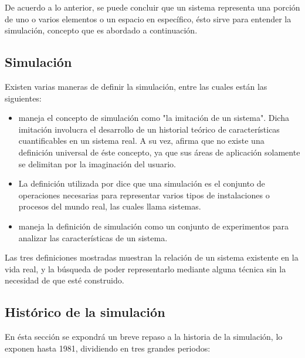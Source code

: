 
De acuerdo a lo anterior, se puede concluir que un sistema representa una porción de uno o varios elementos o un espacio en específico, ésto sirve para entender la simulación, concepto que es abordado a continuación. 

\subsection{Simulación}

Existen varias maneras de definir la simulación, entre las cuales están las siguientes:

\begin{itemize}
    \item \textcite{silvasimulac} maneja el concepto de simulación como "la imitación de un sistema". Dicha imitación involucra el desarrollo de un historial teórico de características cuantificables en un sistema real. A su vez, afirma que no existe una definición universal de éste concepto, ya que sus áreas de aplicación solamente se delimitan por la imaginación del usuario. 
    \item La definición utilizada por \textcite{averill1} dice que una simulación es el conjunto de operaciones necesarias para representar varios tipos de instalaciones o procesos del mundo real, las cuales llama sistemas. 
    \item \textcite{fritzonsim} maneja la definición de simulación como un conjunto de experimentos para analizar las características de un sistema.
\end{itemize}

Las tres definiciones mostradas muestran la relación de un sistema existente en la vida real, y la búsqueda de poder representarlo mediante alguna técnica sin la necesidad de que esté construido.

\subsection{Histórico de la simulación}

En ésta sección se expondrá un breve repaso a la historia de la simulación, \textcite{goldsman1} lo exponen hasta 1981, dividiendo en tres grandes periodos: 

